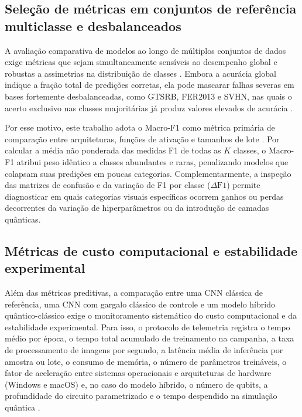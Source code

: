 \documentclass[
    12pt,
    openright,
    oneside,
    a4paper,
    english,
    brazil
]{abntex2}
\begin{document}
\subsection{Seleção de métricas em conjuntos de referência multiclasse e desbalanceados}

A avaliação comparativa de modelos ao longo de múltiplos conjuntos de dados exige métricas que sejam simultaneamente sensíveis ao desempenho global e robustas a assimetrias na distribuição de classes \cite{fawcett2006roc,sokolova2009systematic}. Embora a acurácia global indique a fração total de predições corretas, ela pode mascarar falhas severas em bases fortemente desbalanceadas, como GTSRB, FER2013 e SVHN, nas quais o acerto exclusivo nas classes majoritárias já produz valores elevados de acurácia \cite{silva2025balanceamento}.

Por esse motivo, este trabalho adota o Macro-F1 como métrica primária de comparação entre arquiteturas, funções de ativação e tamanhos de lote \cite{sokolova2009systematic,hand2001simple}. Por calcular a média não ponderada das medidas F1 de todas as \(K\) classes, o Macro-F1 atribui peso idêntico a classes abundantes e raras, penalizando modelos que colapsam suas predições em poucas categorias. Complementarmente, a inspeção das matrizes de confusão e da variação de F1 por classe (\(\Delta\text{F1}\)) permite diagnosticar em quais categorias visuais específicas ocorrem ganhos ou perdas decorrentes da variação de hiperparâmetros ou da introdução de camadas quânticas.

\subsection{Métricas de custo computacional e estabilidade experimental}
\label{subsec:metricas_custo_estabilidade}

Além das métricas preditivas, a comparação entre uma CNN clássica de referência, uma CNN com gargalo clássico de controle e um modelo híbrido quântico-clássico exige o monitoramento sistemático do custo computacional e da estabilidade experimental. Para isso, o protocolo de telemetria registra o tempo médio por época, o tempo total acumulado de treinamento na campanha, a taxa de processamento de imagens por segundo, a latência média de inferência por amostra ou lote, o consumo de memória, o número de parâmetros treináveis, o fator de aceleração entre sistemas operacionais e arquiteturas de hardware (Windows e macOS) e, no caso do modelo híbrido, o número de qubits, a profundidade do circuito parametrizado e o tempo despendido na simulação quântica \cite{Wazlawick2020,faj2023warpspeed}.
\end{document}
